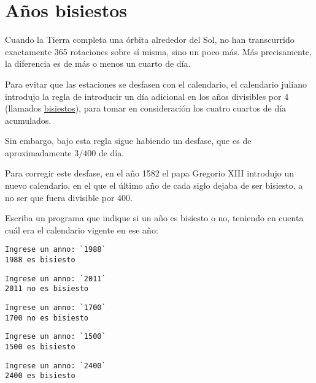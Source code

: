 \section{Años bisiestos}

Cuando la Tierra completa una órbita alrededor del Sol, no han
transcurrido exactamente 365 rotaciones sobre sí misma, sino un poco
más. Más precisamente, la diferencia es de más o menos un cuarto de día.

Para evitar que las estaciones se desfasen con el calendario, el
calendario juliano introdujo la regla de introducir un día adicional en
los años divisibles por 4 (llamados
\href{http://es.wikipedia.org/wiki/A\%C3\%B1o\_bisiesto}{bisiestos}),
para tomar en consideración los cuatro cuartos de día acumulados.

Sin embargo, bajo esta regla sigue habiendo un desfase, que es de
aproximadamente \(3/400\) de día.

Para corregir este desfase, en el año 1582 el papa Gregorio XIII
introdujo un nuevo calendario, en el que el último año de cada siglo
dejaba de ser bisiesto, a no ser que fuera divisible por 400.

Escriba un programa que indique si un año es bisiesto o no, teniendo en
cuenta cuál era el calendario vigente en ese año:

\begin{lstlisting}[language=testcase]
Ingrese un anno: `1988`
1988 es bisiesto
\end{lstlisting}

\begin{lstlisting}[language=testcase]
Ingrese un anno: `2011`
2011 no es bisiesto
\end{lstlisting}

\begin{lstlisting}[language=testcase]
Ingrese un anno: `1700`
1700 no es bisiesto
\end{lstlisting}

\begin{lstlisting}[language=testcase]
Ingrese un anno: `1500`
1500 es bisiesto
\end{lstlisting}

\begin{lstlisting}[language=testcase]
Ingrese un anno: `2400`
2400 es bisiesto
\end{lstlisting}


